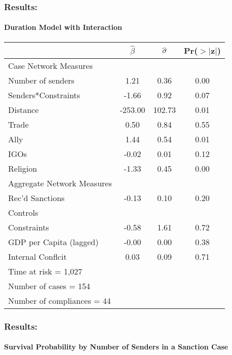 \begin{frame}
\frametitle{Results:}
\framesubtitle{Duration Model with Interaction}

\footnotesize{
	\begin{table}[ht]
		\begin{center}
			\begin{tabular}{lccc}
			\hline\hline
			&$\hat{\beta}$&$\hat{\sigma}$& Pr($>$$|$z$|$) \\
			\hline
			Case Network Measures \\		
			\;\;\; Number of senders & 1.21 & 0.36 & 0.00 \\ 
			\;\;\; Senders*Constraints & -1.66 & 0.92 & 0.07 \\ 		
			\;\;\; Distance & -253.00 & 102.73 & 0.01 \\ 		
			\;\;\; Trade & 0.50 & 0.84 & 0.55 \\ 
			\;\;\; Ally & 1.44 & 0.54 & 0.01 \\ 
			\;\;\; IGOs & -0.02 & 0.01 & 0.12 \\		
			\;\;\; Religion & -1.33 & 0.45 & 0.00 \\ 
			Aggregate Network Measures \\		
			\;\;\; Rec'd Sanctions & -0.13 & 0.10 & 0.20 \\ 
			Controls \\		
			\;\;\; Constraints & -0.58 & 1.61 & 0.72 \\ 
			\;\;\; GDP per Capita (lagged) & -0.00 & 0.00 & 0.38 \\ 
			\;\;\; Internal Conflcit & 0.03 & 0.09 & 0.71 \\ 
			\hline
			Time at risk = 1,027 &&&\\
			Number of cases = 154 &&&\\
			Number of compliances = 44 &&&\\
			\hline\hline
		\end{tabular}
		\end{center}
	\end{table}
}
\end{frame}

\begin{frame}
\frametitle{Results:}
\framesubtitle{Survival Probability by Number of Senders in a Sanction Case}


\end{frame}

